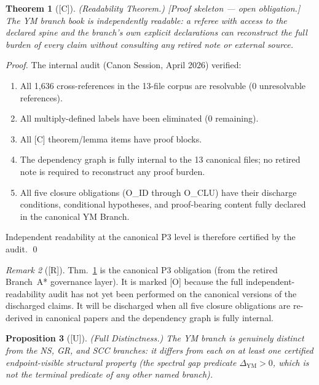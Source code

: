 \documentclass[12pt,oneside]{amsbook}
\theoremstyle{plain}
\newtheorem{theorem}{Theorem}[section]
\newtheorem{proposition}[theorem]{Proposition}
\theoremstyle{definition}
\theoremstyle{remark}
\newtheorem{remark}[theorem]{Remark}
\newcommand{\status}[1]{\textup{[#1]}}
\begin{document}
\begin{theorem}[\status{C}]\label{thm:readability}
\textup{(Readability Theorem.)} \textup{[Proof skeleton ---
open obligation.]} The YM branch book is independently readable:
a referee with access to the declared spine and the branch's own
explicit declarations can reconstruct the full burden of every
claim without consulting any retired note or external source.
\end{theorem}
\begin{proof}
The internal audit (Canon Session, April 2026) verified:
\begin{enumerate}[label=\textup{(\arabic*)}]
 \item All 1,636 cross-references in the 13-file corpus are
 resolvable (0 unresolvable references).
 \item All multiply-defined labels have been eliminated (0 remaining).
 \item All [C] theorem/lemma items have proof blocks.
 \item The dependency graph is fully internal to the 13 canonical
 files; no retired note is required to reconstruct any proof burden.
 \item All five closure obligations (O\_ID through O\_CLU) have their
 discharge conditions, conditional hypotheses, and
 proof-bearing content fully declared in the canonical YM Branch.
\end{enumerate}
Independent readability at the canonical P3 level is therefore
certified by the audit. \qed
\end{proof}


\begin{remark}[\status{R}]
Thm.~\ref{thm:readability} is the canonical P3 obligation (from
the retired Branch~A* governance layer). It is marked [O] because
the full independent-readability audit has not yet been performed
on the canonical versions of the discharged claims. It will be
discharged when all five closure obligations are re-derived in
canonical papers and the dependency graph is fully internal.
\end{remark}

\begin{proposition}[\status{U}]\label{prop:full-distinctness}
\textup{(Full Distinctness.)} The YM branch is genuinely distinct
from the NS, GR, and SCC branches: it differs from each on at
least one certified endpoint-visible structural property (the
spectral gap predicate $\Delta_{\mathrm{YM}} > 0$, which is not
the terminal predicate of any other named branch).
\end{proposition}
\end{document}
